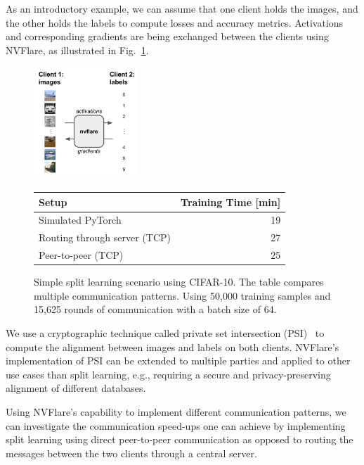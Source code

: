 \documentclass[11pt]{article}
\begin{document}
As an introductory example, we can assume that one client holds the images, and the other holds the labels to compute losses and accuracy metrics. Activations and corresponding gradients are being exchanged between the clients using NVFlare, as illustrated in Fig.~\ref{fig:split_learning}.
%
\begin{figure}[htbp]
\centering
\includegraphics[width=0.35\textwidth]{submissions/HolgerRoth/fig/split_learning.pdf}
\hspace{2em}
\footnotesize
\begin{tabular}[b]{||l r||}
\hline
\textbf{Setup} & \textbf{Training Time [min]} \\ [0.5ex]
\hline\hline
Simulated PyTorch & 19 \\
Routing through server (TCP) & 27  \\
Peer-to-peer (TCP) & 25  \\ [1ex]
\hline
\end{tabular}
\caption{Simple split learning scenario using CIFAR-10. The table compares multiple communication patterns. Using 50,000 training samples and 15,625 rounds of communication with a batch size of 64. \label{fig:split_learning}}
\end{figure}
%
We use a cryptographic technique called private set intersection (PSI)~\cite{Holger-enwiki:1131516757} to compute the alignment between images and labels on both clients. NVFlare's implementation of PSI can be extended to multiple parties and applied to other use cases than split learning, e.g., requiring a secure and privacy-preserving alignment of different databases.

Using NVFlare's capability to implement different communication patterns, we can investigate the communication speed-ups one can achieve by implementing split learning using direct peer-to-peer communication as opposed to routing the messages between the two clients through a central server.
\end{document}
